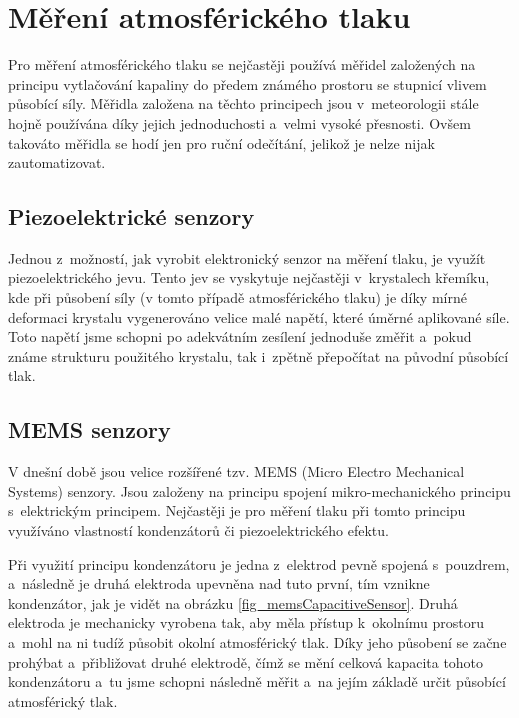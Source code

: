 \section{Měření atmosférického tlaku}

Pro měření atmosférického tlaku se nejčastěji používá měřidel založených na principu vytlačování kapaliny do předem známého prostoru se stupnicí vlivem působící síly. Měřidla založena na těchto principech jsou v~meteorologii stále hojně používána díky jejich jednoduchosti a~velmi vysoké přesnosti. Ovšem takováto měřidla se hodí jen pro ruční odečítání, jelikož je nelze nijak zautomatizovat.

\subsection{Piezoelektrické senzory}

Jednou z~možností, jak vyrobit elektronický senzor na měření tlaku, je využít piezoelektrického jevu. Tento jev se vyskytuje nejčastěji v~krystalech křemíku, kde při působení síly (v tomto případě atmosférického tlaku) je díky mírné deformaci krystalu vygenerováno velice malé napětí, které úměrné aplikované síle. Toto napětí jsme schopni po adekvátním zesílení jednoduše změřit a~pokud známe strukturu použitého krystalu, tak i~zpětně přepočítat na původní působící tlak.

\subsection{MEMS senzory}

V dnešní době jsou velice rozšířené tzv. MEMS (Micro Electro Mechanical Systems) senzory. Jsou založeny na principu spojení mikro-mechanického principu s~elektrickým principem. Nejčastěji je pro měření tlaku při tomto principu využíváno vlastností kondenzátorů či piezoelektrického efektu.

Při využití principu kondenzátoru je jedna z~elektrod pevně spojená s~pouzdrem, a~následně je druhá elektroda upevněna nad tuto první, tím vznikne kondenzátor, jak je vidět na obrázku \ref{fig_memsCapacitiveSensor}. Druhá elektroda je mechanicky vyrobena tak, aby měla přístup k~okolnímu prostoru a~mohl na ni tudíž působit okolní atmosférický tlak. Díky jeho působení se začne prohýbat a~přibližovat druhé elektrodě, čímž se mění celková kapacita tohoto kondenzátoru a~tu jsme schopni následně měřit a~na jejím základě určit působící atmosférický tlak. \cite{teor_PresSens}

